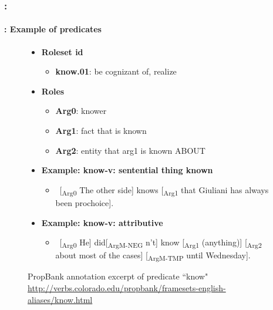 \documentclass[xcolor=table]{beamer}
\begin{document}
\begin{frame}
	\frametitle{\insertshortsubtitle: \insertsection}
	\framesubtitle{\insertsubsection: Example of predicates}
	

	\begin{figure}
		\scriptsize
		\begin{tcolorbox}[colback=white, colframe=blue, boxrule=1pt, text width=.91\textwidth]
		\begin{itemize}
			\item \textbf{Roleset id}
			\begin{itemize}\scriptsize
				\item \textbf{know.01}: be cognizant of, realize
			\end{itemize}
			\item \textbf{Roles}
			\begin{itemize}\scriptsize
				\item \textbf{Arg0}: knower
				\item \textbf{Arg1}: fact that is known
				\item \textbf{Arg2}: entity that arg1 is known ABOUT
			\end{itemize}
		
			\item \textbf{Example: know-v: sentential thing known}
			\begin{itemize}\scriptsize
				\item \ [\textsubscript{\color{red}Arg0} The other side] knows [\textsubscript{\color{red}Arg1} that Giuliani has always been prochoice].
			\end{itemize}
		
			\item \textbf{Example: know-v: attributive}
			\begin{itemize}\scriptsize
				\item \ [\textsubscript{\color{red}Arg0} He] did[\textsubscript{\color{red}ArgM-NEG} n't] know [\textsubscript{\color{red}Arg1} (anything)] [\textsubscript{\color{red}Arg2} about most of the cases] [\textsubscript{\color{red}ArgM-TMP} until Wednesday].
			\end{itemize}
		\end{itemize}
		\end{tcolorbox}
			
		\caption{PropBank annotation excerpt of predicate ``know" \url{http://verbs.colorado.edu/propbank/framesets-english-aliases/know.html}}
	\end{figure}
	
\end{frame}
\end{document}
